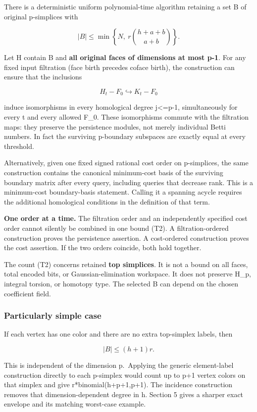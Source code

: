 There is a deterministic uniform polynomial-time algorithm retaining a set B of original p-simplices with

\[
|B|\le \min\left\{N,\ r\binom{h+a+b}{a+b}\right\}.
 \tag{T2}
\]

Let H contain B and \textbf{all original faces of dimensions at most p-1}. For any fixed input filtration (face birth precedes coface birth), the construction can ensure that the inclusions

\[
H_t-F_0\hookrightarrow K_t-F_0
 \tag{T3}
\]

induce isomorphisms in every homological degree j\textless=p-1, simultaneously for every t and every allowed F\_0. These isomorphisms commute with the filtration maps: they preserve the persistence modules, not merely individual Betti numbers. In fact the surviving p-boundary subspaces are exactly equal at every threshold.

Alternatively, given one fixed signed rational cost order on p-simplices, the same construction contains the canonical minimum-cost basis of the surviving boundary matrix after every query, including queries that decrease rank. This is a minimum-cost boundary-basis statement. Calling it a spanning acycle requires the additional homological conditions in the definition of that term.

\textbf{One order at a time.} The filtration order and an independently specified cost order cannot silently be combined in one bound (T2). A filtration-ordered construction proves the persistence assertion. A cost-ordered construction proves the cost assertion. If the two orders coincide, both hold together.

The count (T2) concerns retained \textbf{top simplices}. It is not a bound on all faces, total encoded bits, or Gaussian-elimination workspace. It does not preserve H\_p, integral torsion, or homotopy type. The selected B can depend on the chosen coefficient field.

\hypertarget{af-3f6acd6e5b-particularly-simple-case}{%
\subsubsection{Particularly simple case}\label{af-3f6acd6e5b-particularly-simple-case}}

If each vertex has one color and there are no extra top-simplex labels, then

\[
|B|\le (h+1)r.
 \tag{T4}
\]

This is independent of the dimension p.~Applying the generic element-label construction directly to each p-simplex would count up to p+1 vertex colors on that simplex and give r*binomial(h+p+1,p+1). The incidence construction removes that dimension-dependent degree in h. Section 5 gives a sharper exact envelope and its matching worst-case example.

